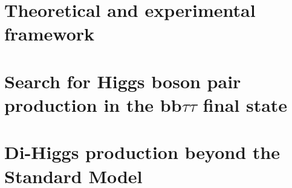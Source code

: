 \documentclass{mimosis}
\begin{document}
\clearpairofpagestyles
{}
\ohead{\pagemark}
\ihead{\headmark}

\renewcommand*{\chaptermarkformat}{}


\frontmatter
  
  
  

  \tableofcontents

\mainmatter

  

  \part{Theoretical and experimental framework}
  
  

  \part{Search for Higgs boson pair production in the bb\texorpdfstring{$\tau\tau$}{ττ} final state}
  
  
  
  

  \part{Di-Higgs production beyond the Standard Model}
  


\backmatter

  
  

  \makeatletter\@mainmattertrue\makeatother
  \appendix
  
  

  \printbibliography


  \printbibliography
\end{document}
